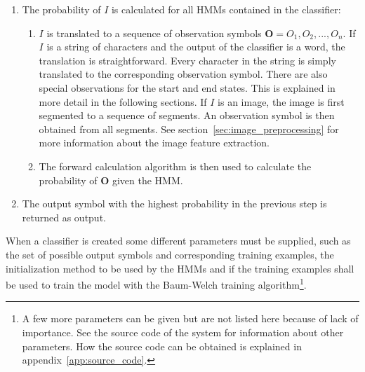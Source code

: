 \begin{enumerate}
  \item The probability of $I$ is calculated for all HMMs contained in the classifier:
    \begin{enumerate}
      \item $I$ is translated to a sequence of observation symbols $\mathbf{O} = O_{1},O_{2},...,O_{n}$. If $I$ is a string of characters and the output of the classifier is a word, the translation is straightforward. Every character in the string is simply translated to the corresponding observation symbol. There are also special observations for the start and end states. 
      This is explained in more detail in the following sections. If $I$ is an image, the image is first segmented to a sequence of segments. An observation symbol is then obtained from all segments. See section~\ref{sec:image_preprocessing} for more information about the image feature extraction.
      \item The forward calculation algorithm \cite{Rabiner1989} is then used to calculate the probability of $\mathbf{O}$ given the HMM.
    \end{enumerate}
  \item The output symbol with the highest probability in the previous step is returned as output.
\end{enumerate}
 
When a classifier is created some different parameters must be supplied, such as the set of possible output symbols and corresponding training examples, the initialization method to be used by the HMMs and if the training examples shall be used to train the model with the Baum-Welch \cite{Rabiner1989} training algorithm\footnote{A few more parameters can be given but are not listed here because of lack of importance. See the source code of the system for information about other parameters. How the source code can be obtained is explained in appendix~\ref{app:source_code}.}.